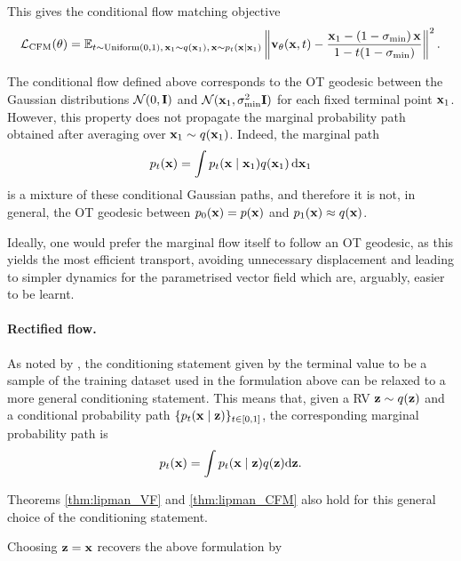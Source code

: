 This gives the conditional flow matching objective
\begin{equation}
\label{eq:CFM_loss_final}
{\mathcal L}_\text{CFM}(\theta)
=
\mathbb{E}_{t\sim\text{Uniform}\left(0,1\right),\,{ \mathbf{x}}_1\sim q({ \mathbf{x}}_1),\,{ \mathbf{x}}\sim p_t({ \mathbf{x}} \mid { \mathbf{x}}_1)}
\left\|
{ \mathbf{v}}_\theta({ \mathbf{x}},t)
-
\frac{{ \mathbf{x}}_1 - (1-\sigma_{\min})\,{ \mathbf{x}}}
     {1 - t(1-\sigma_{\min})}
\right\|^2 .
\end{equation}

\begin{remark}
The conditional flow defined above corresponds to the OT geodesic between the Gaussian distributions 
${\mathcal N}(0,{\mathbf I})$ and ${\mathcal N}({ \mathbf{x}}_1,\sigma_{\min}^2{\mathbf I})$ for each fixed terminal point ${ \mathbf{x}}_1$. 
However, this property does not propagate the marginal probability path obtained after averaging over ${ \mathbf{x}}_1 \sim q({ \mathbf{x}}_1)$. 
Indeed, the marginal path 
\[
p_t({ \mathbf{x}}) = \int p_t({ \mathbf{x}} \mid { \mathbf{x}}_1) q({ \mathbf{x}}_1)\,{\text{d}} { \mathbf{x}}_1
\]
is a mixture of these conditional Gaussian paths, and therefore it is not, in general, the OT geodesic between $p_0({ \mathbf{x}})=p({ \mathbf{x}})$ and $p_1({ \mathbf{x}})\approx q({ \mathbf{x}})$.

Ideally, one would prefer the marginal flow itself to follow an OT geodesic, as this yields the most efficient transport, avoiding unnecessary displacement and leading to simpler dynamics for the parametrised vector field which are, arguably, easier to be learnt.
\end{remark}



\paragraph{Rectified flow.} As noted by \cite{tong2023improving}, the conditioning statement given by the terminal value to be a sample of the training dataset used in the formulation above can be relaxed to a more general conditioning statement. This means that, given a RV ${ \mathbf{z}}\sim q({ \mathbf{z}})$ and a conditional probability path $\{p_t({ \mathbf{x}} \mid { \mathbf{z}})\}_{t\in[0,1]}$, the corresponding marginal probability path is 
\begin{equation}
    p_t({ \mathbf{x}}) = \int p_t({ \mathbf{x}} \mid { \mathbf{z}}) q({ \mathbf{z}}) {\text{d}}{ \mathbf{z}}.
\end{equation}
\begin{remark}
    Theorems \ref{thm:lipman_VF} and  \ref{thm:lipman_CFM} also hold for this general choice of the conditioning statement. 
\end{remark}
\begin{remark}
    Choosing ${ \mathbf{z}}={ \mathbf{x}}$ recovers the above formulation by \cite{lipman2023flowmatching}
\end{remark}


